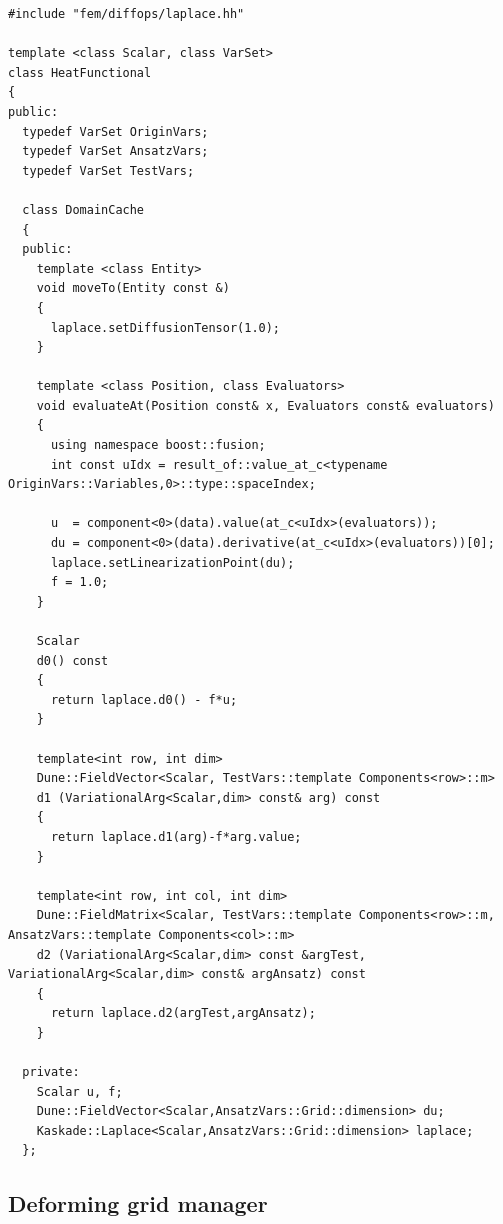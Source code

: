 \documentclass[11pt]{article}
\begin{document}
\begin{lstlisting}
#include "fem/diffops/laplace.hh"

template <class Scalar, class VarSet>
class HeatFunctional
{
public:
  typedef VarSet OriginVars;
  typedef VarSet AnsatzVars;
  typedef VarSet TestVars;

  class DomainCache 
  {
  public:
    template <class Entity>
    void moveTo(Entity const &) 
    { 
      laplace.setDiffusionTensor(1.0);
    }

    template <class Position, class Evaluators>
    void evaluateAt(Position const& x, Evaluators const& evaluators) 
    {
      using namespace boost::fusion;
      int const uIdx = result_of::value_at_c<typename OriginVars::Variables,0>::type::spaceIndex;

      u  = component<0>(data).value(at_c<uIdx>(evaluators));
      du = component<0>(data).derivative(at_c<uIdx>(evaluators))[0];
      laplace.setLinearizationPoint(du);
      f = 1.0;
    }

    Scalar
    d0() const 
    {
      return laplace.d0() - f*u;
    }
    
    template<int row, int dim> 
    Dune::FieldVector<Scalar, TestVars::template Components<row>::m>
    d1 (VariationalArg<Scalar,dim> const& arg) const 
    {
      return laplace.d1(arg)-f*arg.value; 
    }

    template<int row, int col, int dim> 
    Dune::FieldMatrix<Scalar, TestVars::template Components<row>::m, AnsatzVars::template Components<col>::m>
    d2 (VariationalArg<Scalar,dim> const &argTest, VariationalArg<Scalar,dim> const& argAnsatz) const 
    {
      return laplace.d2(argTest,argAnsatz);
    }

  private:
    Scalar u, f;
    Dune::FieldVector<Scalar,AnsatzVars::Grid::dimension> du;
    Kaskade::Laplace<Scalar,AnsatzVars::Grid::dimension> laplace;
  };
\end{lstlisting}

\subsection{Deforming grid manager} \label{subsec:DeformingGridManager}
\end{document}
